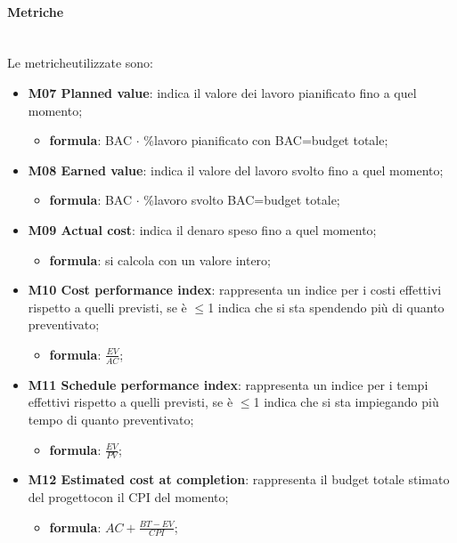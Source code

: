 		\paragraph*{Metriche}\mbox{}\\ [1mm]
		Le metriche\glosp utilizzate sono:
		\begin{itemize}		
			\item \textbf{M07 Planned value}: indica il valore dei lavoro pianificato fino a quel momento;
			\begin{itemize}
				\item[] \textbf{formula}: BAC $\cdot$ \%lavoro pianificato con BAC=budget totale;
			\end{itemize}
			
			\item \textbf{M08 Earned value}: indica il valore del lavoro svolto fino a quel momento;
			\begin{itemize}
				\item[] \textbf{formula}: BAC $\cdot$ \%lavoro svolto BAC=budget totale;
			\end{itemize} 
			
			\item \textbf{M09 Actual cost}: indica il denaro speso fino a quel momento; 
			\begin{itemize}
				\item[] \textbf{formula}: si calcola con un valore intero;
			\end{itemize}
			
			\item \textbf{M10 Cost performance index}: rappresenta un indice per i costi effettivi rispetto a quelli previsti, se è $\le$1 indica che si sta spendendo più di quanto preventivato;
			\begin{itemize}
				\item[] \textbf{formula}: $\frac{EV}{AC}$; 
			\end{itemize}
			
			\item \textbf{M11 Schedule performance index}: rappresenta un indice per i tempi effettivi rispetto a quelli previsti, se è $\le$1 indica che si sta impiegando più tempo di quanto preventivato;
			\begin{itemize}
				\item[] \textbf{formula}: $\frac{EV}{PV}$; 
			\end{itemize}
			
			\item \textbf{M12 Estimated cost at completion}: rappresenta il budget totale stimato del progetto\glosp con il CPI del momento;
			\begin{itemize}
				\item[] \textbf{formula}: $AC+\frac{BT-EV}{CPI}$; 
			\end{itemize} 
			

\end{itemize}
